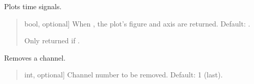\documentclass[letterpaper,10pt,english]{sphinxmanual}
\begin{document}
\begin{fulllineitems}
\begin{fulllineitems}
\label{\detokenize{classes:dsptools.classes.signal_class.Signal.plot_time}}
\pysigstartsignatures
{}
\pysigstopsignatures
\sphinxAtStartPar
Plots time signals.
\begin{quote}\begin{description}
\begin{description}
\sphinxlineitem{\sphinxstylestrong{returns}}{[}bool, optional{]}
\sphinxAtStartPar
When , the plot’s figure and axis are returned.
Default: .

\end{description}

\begin{description}
\sphinxAtStartPar
Only returned if .

\end{description}

\end{description}\end{quote}

\end{fulllineitems}


\begin{fulllineitems}
\label{\detokenize{classes:dsptools.classes.signal_class.Signal.remove_channel}}
\pysigstartsignatures
{}
\pysigstopsignatures
\sphinxAtStartPar
Removes a channel.
\begin{quote}\begin{description}
\begin{description}
\sphinxlineitem{\sphinxstylestrong{channel\_number}}{[}int, optional{]}
\sphinxAtStartPar
Channel number to be removed. Default: \sphinxhyphen{}1 (last).


\end{description}
\end{description}
\end{quote}
\end{fulllineitems}
\end{fulllineitems}
\end{document}
